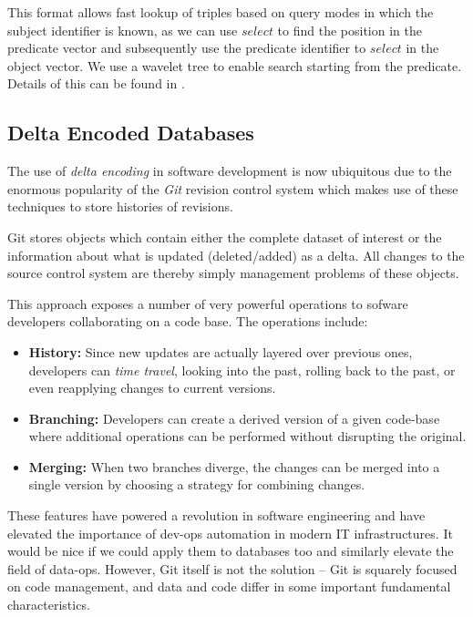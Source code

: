 \documentclass[10pt, a4paper, twocolumn]{article} %
\begin{document}
This format allows fast lookup of triples based on query modes in
which the subject identifier is known, as we can use \(select\) to
find the position in the predicate vector and subsequently use the
predicate identifier to \(select\) in the object vector. We use a
wavelet tree to enable search starting from the predicate. Details of
this can be found in \autocite{10.1007/978-3-642-30284-8_36}.

\subsection{Delta Encoded Databases}

The use of {\em delta encoding} in software development is now
ubiquitous due to the enormous popularity of the {\em Git} revision
control system which makes use of these techniques to store histories
of revisions.

Git stores objects which contain either the complete dataset of
interest or the information about what is updated (deleted/added) as
a delta. All changes to the source control system are thereby simply
management problems of these objects.

This approach exposes a number of very powerful operations to sofware
developers collaborating on a code base. The operations include:

\begin{itemize}
\item {\bf History:} Since new updates are actually layered over previous
  ones, developers can {\em time travel}, looking into the past,
  rolling back to the past, or even reapplying changes to current
  versions.
\item {\bf Branching:} Developers can create a derived version of a given
  code-base where additional operations can be performed without
  disrupting the original.
\item {\bf Merging:} When two branches diverge, the changes can be merged
  into a single version by choosing a strategy for combining changes.
\end{itemize}

These features have powered a revolution in software engineering and
have elevated the importance of dev-ops automation in modern IT
infrastructures. It would be nice if we could apply them to databases
too and similarly elevate the field of data-ops. However, Git itself
is not the solution – Git is squarely focused on code management, and
data and code differ in some important fundamental characteristics.
\end{document}
